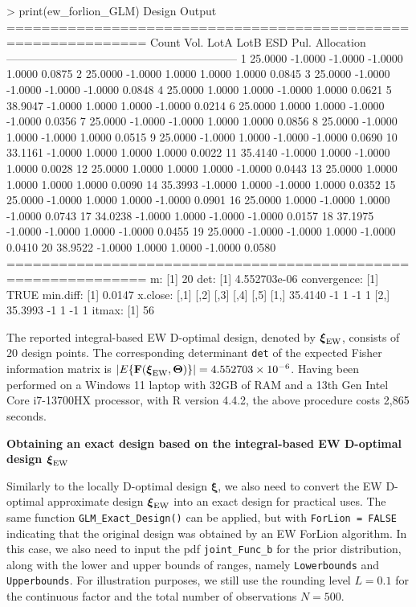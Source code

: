 \begin{example}
> print(ew_forlion_GLM)
Design Output
============================================================== 
Count  Vol.     LotA     LotB     ESD      Pul.     Allocation
-------------------------------------------------------------- 
1      25.0000  -1.0000  -1.0000  -1.0000   1.0000  0.0875
2      25.0000  -1.0000   1.0000   1.0000   1.0000  0.0845
3      25.0000  -1.0000  -1.0000  -1.0000  -1.0000  0.0848
4      25.0000   1.0000   1.0000  -1.0000   1.0000  0.0621
5      38.9047  -1.0000   1.0000   1.0000  -1.0000  0.0214
6      25.0000   1.0000   1.0000  -1.0000  -1.0000  0.0356
7      25.0000  -1.0000  -1.0000   1.0000   1.0000  0.0856
8      25.0000  -1.0000   1.0000  -1.0000   1.0000  0.0515
9      25.0000  -1.0000   1.0000  -1.0000  -1.0000  0.0690
10     33.1161  -1.0000   1.0000   1.0000   1.0000  0.0022
11     35.4140  -1.0000   1.0000  -1.0000   1.0000  0.0028
12     25.0000   1.0000   1.0000   1.0000  -1.0000  0.0443
13     25.0000   1.0000   1.0000   1.0000   1.0000  0.0090
14     35.3993  -1.0000   1.0000  -1.0000   1.0000  0.0352
15     25.0000  -1.0000   1.0000   1.0000  -1.0000  0.0901
16     25.0000   1.0000  -1.0000   1.0000  -1.0000  0.0743
17     34.0238  -1.0000   1.0000  -1.0000  -1.0000  0.0157
18     37.1975  -1.0000  -1.0000   1.0000  -1.0000  0.0455
19     25.0000  -1.0000  -1.0000   1.0000  -1.0000  0.0410
20     38.9522  -1.0000   1.0000   1.0000  -1.0000  0.0580
============================================================== 
m:
[1] 20
det:
[1] 4.552703e-06
convergence:
[1] TRUE
min.diff:
[1] 0.0147
x.close:
        [,1] [,2] [,3] [,4] [,5]
[1,] 35.4140   -1    1   -1    1
[2,] 35.3993   -1    1   -1    1
itmax:
[1] 56
\end{example}

The reported integral-based EW D-optimal design, denoted by $\boldsymbol{\xi}_{\rm EW}$, consists of $20$ design points. The corresponding determinant {\tt det} of the expected Fisher information matrix is $| E\{{\mathbf F}({\boldsymbol \xi}_{\rm EW}, \boldsymbol{\Theta})\}| = 4.552703 \times 10^{-6}$. Having been performed on a Windows 11 laptop with 32GB of RAM and a 13th Gen Intel Core i7-13700HX processor, with R version 4.4.2, the above procedure costs 2,865 seconds.

\medskip
\noindent
{\bf Obtaining an exact design based on the integral-based EW D-optimal design $\boldsymbol{\xi}_{\rm EW}$}
\smallskip

\noindent
Similarly to the locally D-optimal design $\boldsymbol{\xi}$, we also need to convert the EW D-optimal approximate design $\boldsymbol{\xi}_{\rm EW}$ into an exact design for practical uses. The same function \verb|GLM_Exact_Design()| can be applied, but with \verb|ForLion = FALSE| indicating that the original design was obtained by an EW ForLion algorithm. In this case, we also need to input the pdf \verb|joint_Func_b| for the prior distribution, along with the lower and upper bounds of ranges, namely \verb|Lowerbounds| and \verb|Upperbounds|. For illustration purposes, we still use the rounding level $L=0.1$ for the continuous factor and the total number of observations $N=500$.

